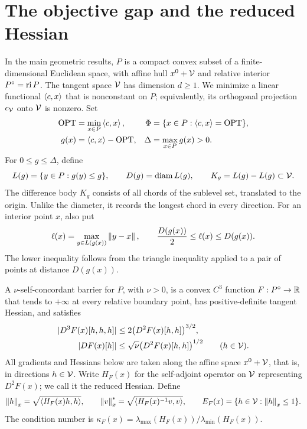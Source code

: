 \section{The objective gap and the reduced Hessian}
\label{sec:setup}

In the main geometric results, $P$ is a compact convex subset of a
finite-dimensional Euclidean space, with affine hull $x^0+\mathcal V$ and relative
interior $P^\circ=\operatorname{ri} P$. The tangent space $\mathcal V$ has dimension $d\geq1$.
We minimize a linear functional $\left\langle c,x\right\rangle$ that is nonconstant on $P$;
equivalently, its orthogonal projection $c_{\mathcal V}$ onto $\mathcal V$ is nonzero. Set
\begin{align}
 \operatorname{OPT}&=\min_{x\in P}\left\langle c,x\right\rangle, &
 \Phi&=\{x\in P:\left\langle c,x\right\rangle=\operatorname{OPT}\},\label{eq:optimum}\\
 g(x)&=\left\langle c,x\right\rangle-\operatorname{OPT}, &
 \Delta&=\max_{x\in P}g(x)>0.\label{eq:gap-range}
\end{align}
For $0\leq g\leq\Delta$, define
\begin{equation}
 L(g)=\{y\in P:g(y)\leq g\},\qquad
 D(g)=\operatorname{diam} L(g),\qquad K_g=L(g)-L(g)\subset\mathcal V.
 \label{eq:sublevels}
\end{equation}
The difference body $K_g$ consists of all chords of the sublevel set,
translated to the origin. Unlike the diameter, it records the longest
chord in every direction. For an interior point $x$, also put
\begin{equation}
 \ell(x)=\max_{y\in L(g(x))}\left\lVert y-x\right\rVert,\qquad
 \frac{D(g(x))}{2}\leq\ell(x)\leq D(g(x)).
 \label{eq:chord-length}
\end{equation}
The lower inequality follows from the triangle inequality applied to a
pair of points at distance $D(g(x))$.

\begin{definition}
\label{def:barrier}
A $\nu$-self-concordant barrier for $P$, with $\nu>0$, is a convex
$C^3$ function $F:P^\circ\to\mathbb R$ that tends to $+\infty$ at every relative
boundary point, has positive-definite tangent Hessian, and satisfies
\begin{align}
 |D^3F(x)[h,h,h]|&\leq2\bigl(D^2F(x)[h,h]\bigr)^{3/2},\label{eq:sc}\\
 |DF(x)[h]|&\leq\sqrt\nu\bigl(D^2F(x)[h,h]\bigr)^{1/2}
 \qquad(h\in\mathcal V).\label{eq:barrier-gradient}
\end{align}
All gradients and Hessians below are taken along the affine space
$x^0+\mathcal V$, that is, in directions $h\in\mathcal V$. Write $H_F(x)$ for the
self-adjoint operator on $\mathcal V$ representing $D^2F(x)$; we call it the
reduced Hessian. Define
\begin{equation}
 \left\lVert h\right\rVert_x=\sqrt{\left\langle H_F(x)h,h\right\rangle},\qquad
 \left\lVert v\right\rVert_x^*=\sqrt{\left\langle H_F(x)^{-1}v,v\right\rangle},\qquad
 E_F(x)=\{h\in\mathcal V:\left\lVert h\right\rVert_x\leq1\}.
 \label{eq:local-metric}
\end{equation}
The condition number is
$\kappa_F(x)=\lambda_{\max}(H_F(x))/\lambda_{\min}(H_F(x))$.
\end{definition}

